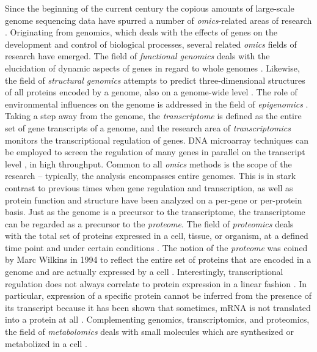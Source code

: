 Since the beginning of the current century the copious amounts of large-scale 
genome sequencing data have spurred a number of {\em omics}-related areas of 
research \citep{Sauer2007, Colquhoun2005}.
Originating from genomics, which deals with the effects of genes on the 
development and control of biological processes, several related {\em omics} 
fields of research have emerged.
The field of {\em functional
genomics} deals with the elucidation of dynamic aspects of genes in regard
to whole genomes \citep{Hieter1997}.
Likewise, the field of {\em structural genomics} attempts to predict 
three-dimensional structures of all proteins encoded by a genome, also on
a genome-wide level \citep{Baker2001a}.
The role of environmental influences on the genome is addressed in the field
of {\em epigenomics} \citep{Jirtle2007}.
Taking a step away from the genome, the {\em transcriptome} is defined as the 
entire set of gene transcripts of a genome, and the research area of 
{\em transcriptomics} monitors the transcriptional regulation of genes.
DNA microarray techniques can be employed to screen the regulation of many
genes in parallel on the transcript level \citep{Schena1995}, in high throughput.
Common to all {\em omics} methods is the scope of the research -- typically, the 
analysis encompasses entire genomes.
This is in stark contrast to previous times when gene regulation and 
transcription, as well as protein function and structure have been analyzed on 
a per-gene or per-protein basis.
Just as the genome is a precursor to the transcriptome, the transcriptome can
be regarded as a precursor to the {\em proteome}.
The field of {\em proteomics} deals with the total set of proteins expressed in 
a cell, tissue, or organism, at a defined time point and under certain 
conditions \citep{Yarmush2002, Yates2009}.
The notion of the {\em proteome} was coined by Marc Wilkins in 1994 
to reflect the entire set of proteins that are encoded in a genome and are 
actually expressed by a cell \citep{Wilkins2009}.
Interestingly, transcriptional regulation does not always correlate to
protein expression in a linear fashion \citep{Rogers2008}.
In particular, expression of a specific protein cannot be inferred from the 
presence of its transcript because it has been shown that sometimes, mRNA 
is not translated into a protein at all \citep{Eddy2001}.
Complementing genomics, transcriptomics, and proteomics, the field of
{\em metabolomics} deals with small molecules which are synthesized or
metabolized in a cell \citep{Kell2004}.

